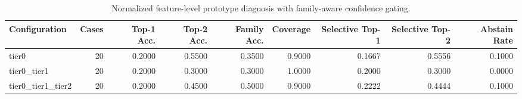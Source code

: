 \begin{table}[t]
\centering
\caption{Normalized feature-level prototype diagnosis with family-aware confidence gating.}
\label{tab:dice_stressor_hierarchical_diagnosis}
\footnotesize
\begin{tabular}{lrrrrrrrr}
\toprule
Configuration & Cases & Top-1 Acc. & Top-2 Acc. & Family Acc. & Coverage & Selective Top-1 & Selective Top-2 & Abstain Rate \\
\midrule
tier0 & 20 & 0.2000 & 0.5500 & 0.3500 & 0.9000 & 0.1667 & 0.5556 & 0.1000 \\
tier0_tier1 & 20 & 0.2000 & 0.3000 & 0.3000 & 1.0000 & 0.2000 & 0.3000 & 0.0000 \\
tier0_tier1_tier2 & 20 & 0.2000 & 0.4500 & 0.5000 & 0.9000 & 0.2222 & 0.4444 & 0.1000 \\
\bottomrule
\end{tabular}

\end{table}
